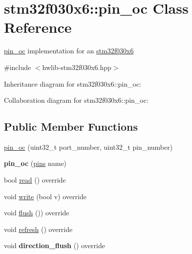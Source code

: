 \hypertarget{classstm32f030x6_1_1pin__oc}{}\section{stm32f030x6\+:\+:pin\+\_\+oc Class Reference}
\label{classstm32f030x6_1_1pin__oc}


\hyperlink{classstm32f030x6_1_1pin__oc}{pin\+\_\+oc} implementation for an \hyperlink{namespacestm32f030x6}{stm32f030x6}  




{\ttfamily \#include $<$hwlib-\/stm32f030x6.\+hpp$>$}



Inheritance diagram for stm32f030x6\+:\+:pin\+\_\+oc\+:


Collaboration diagram for stm32f030x6\+:\+:pin\+\_\+oc\+:
\subsection*{Public Member Functions}
\begin{DoxyCompactItemize}
\item 
\hyperlink{classstm32f030x6_1_1pin__oc_ad0c22cf306b23e62917d6610131ae5f7}{pin\+\_\+oc} (uint32\+\_\+t port\+\_\+number, uint32\+\_\+t pin\+\_\+number)
\item 
\mbox{\label{classstm32f030x6_1_1pin__oc_a577488ae6474386647af2c5b7a08a65b}} 
{\bfseries pin\+\_\+oc} (\hyperlink{namespacestm32f030x6_aec819db41bff19f45418c0d22e5ccecf}{pins} name)
\item 
bool \hyperlink{classstm32f030x6_1_1pin__oc_a97615ebdacdd8405e87f8f6440e5fce1}{read} () override
\item 
void \hyperlink{classstm32f030x6_1_1pin__oc_a08be59f5868ae70133e95d172318043b}{write} (bool v) override
\item 
void \hyperlink{classstm32f030x6_1_1pin__oc_afa293f1a0ee8f1cb4936521df144453e}{flush} ()) override
\item 
void \hyperlink{classstm32f030x6_1_1pin__oc_ab856468835abcd32a9161b94c789ec7d}{refresh} () override
\item 
\mbox{\label{classstm32f030x6_1_1pin__oc_ab3241925a4e05ba4902cd37dbd9c997d}} 
void {\bfseries direction\+\_\+flush} () override
\end{DoxyCompactItemize}


